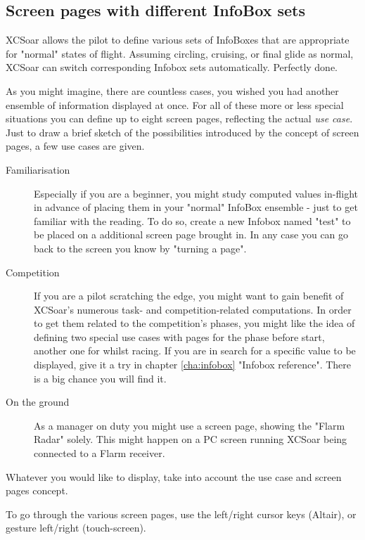 \subsection*{Screen pages with different InfoBox sets}

XCSoar allows the pilot to define various sets of InfoBoxes that are 
appropriate for "normal" states of flight.  Assuming circling, 
cruising, or final glide as normal, XCSoar can switch corresponding Infobox 
sets automatically. Perfectly done.

As you might imagine, there are countless cases, you wished you had another 
ensemble of information displayed at once.  For all of these more or less 
special situations you can define up to eight screen pages, reflecting the 
actual \emph{use case}. Just to draw a brief sketch of the possibilities 
introduced by the concept of screen pages, a few use cases are given. 
\label{par:use_case}
\begin{description}
\item[Familiarisation] Especially if you are a beginner, you might study 
computed values in-flight in advance of placing them in your "normal" InfoBox 
ensemble - just to get familiar with the reading. To do so, create a new 
Infobox named "test" to be placed on a additional screen page brought in. In 
any case you can go back to the screen you know by "turning a page".
\item[Competition] If you are a pilot scratching the edge, you might want to 
gain benefit of XCSoar's numerous task- and competition-related computations. 
In order to get them related to the competition's phases, you might like the 
idea of defining two special use cases with pages for the phase before start, 
another one for whilst racing.  If you are in search for a specific value to 
be displayed, give it a try in chapter \ref{cha:infobox} "Infobox reference". 
There is a big chance you will find it.
\item[On the ground] As a manager on duty you might use a screen page, showing 
the "Flarm Radar" solely.  This might happen on a PC screen running XCSoar 
being connected to a Flarm receiver.
\end{description}

Whatever you would like to display, take into account the use case and screen 
pages concept.

To go through the various screen pages, use the left/right cursor 
keys (Altair), or gesture left/right (touch-screen).


